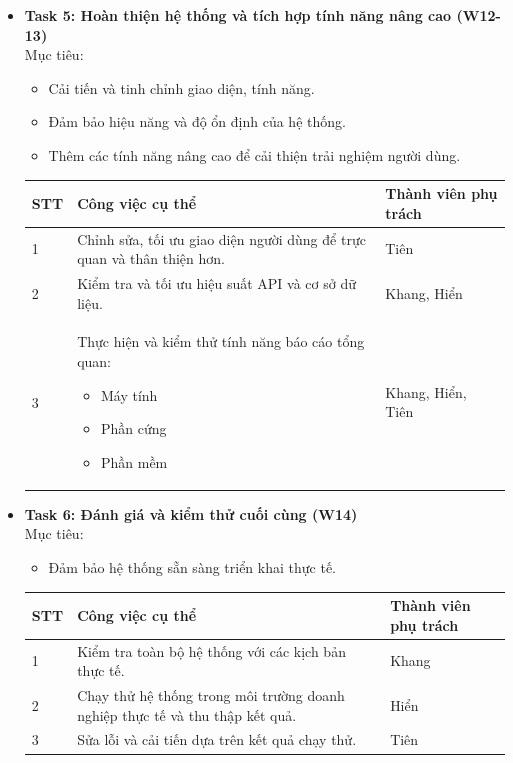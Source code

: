 \begin{itemize}
\item\textbf{Task 5: Hoàn thiện hệ thống và tích hợp tính năng nâng cao (W12-13)}\\
\indent Mục tiêu:
\begin{itemize}
    \item Cải tiến và tinh chỉnh giao diện, tính năng.
    \item Đảm bảo hiệu năng và độ ổn định của hệ thống.
    \item Thêm các tính năng nâng cao để cải thiện trải nghiệm người dùng.
\end{itemize}
\begin{table}[H]
    \centering
    \begin{tabular}{|p{1cm}|p{8cm}|p{4cm}|}
        \hline
        \textbf{STT} & \textbf{Công việc cụ thể} & \textbf{Thành viên phụ trách} \\
        \hline
        1 & 
        Chỉnh sửa, tối ưu giao diện người dùng để trực quan và thân thiện hơn. & Tiên \\
        \hline
        2 & 
        Kiểm tra và tối ưu hiệu suất API và cơ sở dữ liệu. & Khang, Hiển \\
        \hline
        3 & 
        Thực hiện và kiểm thử tính năng báo cáo tổng quan:
        \begin{itemize}
            \item Máy tính
            \item Phần cứng
            \item Phần mềm
        \end{itemize} & Khang, Hiển, Tiên \\
        \hline
    \end{tabular}
\end{table}

\item\textbf{Task 6: Đánh giá và kiểm thử cuối cùng (W14)}\\
\indent Mục tiêu:
\begin{itemize}
    \item Đảm bảo hệ thống sẵn sàng triển khai thực tế.
\end{itemize}
\begin{table}[H]
    \centering
    \begin{tabular}{|p{1cm}|p{8cm}|p{4cm}|}
        \hline
        \textbf{STT} & \textbf{Công việc cụ thể} & \textbf{Thành viên phụ trách} \\
        \hline
        1 & Kiểm tra toàn bộ hệ thống với các kịch bản thực tế. & Khang \\
        \hline
        2 & Chạy thử hệ thống trong môi trường doanh nghiệp thực tế và thu thập kết quả. & Hiển \\
        \hline
        3 & Sửa lỗi và cải tiến dựa trên kết quả chạy thử. &  Tiên \\
        \hline
    \end{tabular}
\end{table}


\end{itemize}
